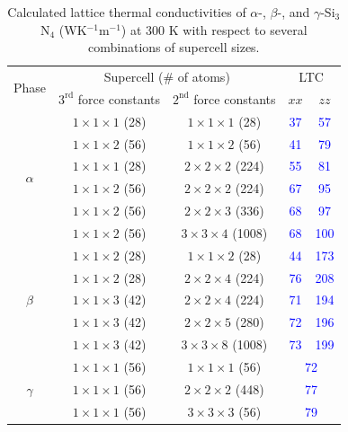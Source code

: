 \documentclass[twocolumn,amsmath,amssymb,a4paper,prb,superscriptaddress,floatfix]{revtex4-1}
\begin{document}
\begin{table}[ht]
	\caption{\label{table:LTC} Calculated lattice thermal conductivities 
 of $\alpha$-, $\beta$-, and $\gamma$-Si$_3$N$_4$
 (WK$^{-1}$m$^{-1}$) at 300 K with respect to several combinations of
 supercell sizes.}
 \begin{ruledtabular}
  \begin{tabular}{ccccc}
   \multirow{2}{*}{Phase}
   & \multicolumn{2}{c}{Supercell (\# of atoms)} &
   \multicolumn{2}{c}{LTC} \\
   \cline{2-5}
   & $3^\text{rd}$ force constants & $2^\text{nd}$ force constants & $xx$ & $zz$ \\
   \hline
   \multirow{6}{*}{$\alpha$}
   & $1\times 1\times 1$ (28) & $1\times
   1\times 1$ (28) & \textcolor{blue}{37} &   \textcolor{blue}{57} \\ 
   & $1\times 1\times 2$ (56) & $1\times
   1\times 2$ (56) & \textcolor{blue}{41} &   \textcolor{blue}{79} \\ 
   & $1\times 1\times 1$ (28) & $2\times
   2\times 2$ (224) & \textcolor{blue}{55} &   \textcolor{blue}{81} \\ 
   & $1\times 1\times 2$ (56) & $2\times
   2\times 2$ (224) & \textcolor{blue}{67} &   \textcolor{blue}{95} \\ 
   & $1\times 1\times 2$ (56) & $2\times
   2\times 3$ (336) & \textcolor{blue}{68} &  \textcolor{blue}{97} \\ 
   & $1\times 1\times 2$ (56) & $3\times
   3\times 4$ (1008) & \textcolor{blue}{68} &  \textcolor{blue}{100} \\ 
   \hline
   \multirow{5}{*}{$\beta$}
   & $1\times 1\times 2$ (28) & $1\times
   1\times 2$ (28) & \textcolor{blue}{44} & \textcolor{blue}{173} \\ 
   & $1\times 1\times 2$ (28) & $2\times
   2\times 4$ (224) & \textcolor{blue}{76} &  \textcolor{blue}{208} \\ 
   & $1\times 1\times 3$ (42) & $2\times
   2\times 4$ (224) & \textcolor{blue}{71} & \textcolor{blue}{194} \\ 
   & $1\times 1\times 3$ (42) & $2\times
   2\times 5$ (280) & \textcolor{blue}{72} & \textcolor{blue}{196} \\ 
   & $1\times 1\times 3$ (42) & $3\times
   3\times 8$ (1008) & \textcolor{blue}{73} & \textcolor{blue}{199} \\ 
   \hline
   \multirow{3}{*}{$\gamma$}
   & $1\times 1\times 1$ (56) & $1\times
   1\times 1$ (56) & \multicolumn{2}{c}{\textcolor{blue}{72}} \\ 
   & $1\times 1\times 1$ (56) & $2\times
   2\times 2$ (448) & \multicolumn{2}{c}{\textcolor{blue}{77}} \\ 
   & $1\times 1\times 1$ (56) & $3\times
   3\times 3$ (56) & \multicolumn{2}{c}{\textcolor{blue}{79}} \\ 
  \end{tabular}
 \end{ruledtabular}
\end{table}
\end{document}

